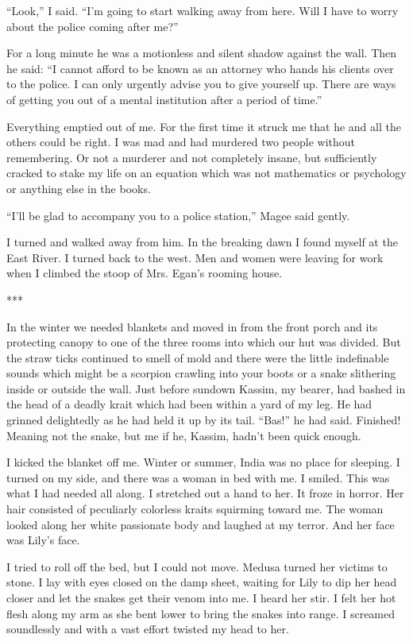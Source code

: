 \documentclass{novel}
\begin{document}
“Look,” I said. “I’m going to start walking away from here. Will I have to worry about the police coming after me?”

For a long minute he was a motionless and silent shadow against the wall. Then he said: “I cannot afford to be known as an attorney who hands his clients over to the police. I can only urgently advise you to give yourself up. There are ways of getting you out of a mental institution after a period of time.”

Everything emptied out of me. For the first time it struck me that he and all the others could be right. I was mad and had murdered two people without remembering. Or not a murderer and not completely insane, but sufficiently cracked to stake my life on an equation which was not mathematics or psychology or anything else in the books.

“I’ll be glad to accompany you to a police station,” Magee said gently.

I turned and walked away from him. In the breaking dawn I found myself at the East River. I turned back to the west. Men and women were leaving for work when I climbed the stoop of Mrs. Egan’s rooming house.

***

In the winter we needed blankets and moved in from the front porch and its protecting canopy to one of the three rooms into which our hut was divided. But the straw ticks continued to smell of mold and there were the little indefinable sounds which might be a scorpion crawling into your boots or a snake slithering inside or outside the wall. Just before sundown Kassim, my bearer, had bashed in the head of a deadly krait which had been within a yard of my leg. He had grinned delightedly as he had held it up by its tail. “Bas!” he had said. Finished! Meaning not the snake, but me if he, Kassim, hadn’t been quick enough.

I kicked the blanket off me. Winter or summer, India was no place for sleeping. I turned on my side, and there was a woman in bed with me. I smiled. This was what I had needed all along. I stretched out a hand to her. It froze in horror. Her hair consisted of peculiarly colorless kraits squirming toward me. The woman looked along her white passionate body and laughed at my terror. And her face was Lily’s face.

I tried to roll off the bed, but I could not move. Medusa turned her victims to stone. I lay with eyes closed on the damp sheet, waiting for Lily to dip her head closer and let the snakes get their venom into me. I heard her stir. I felt her hot flesh along my arm as she bent lower to bring the snakes into range. I screamed soundlessly and with a vast effort twisted my head to her.
\end{document}
